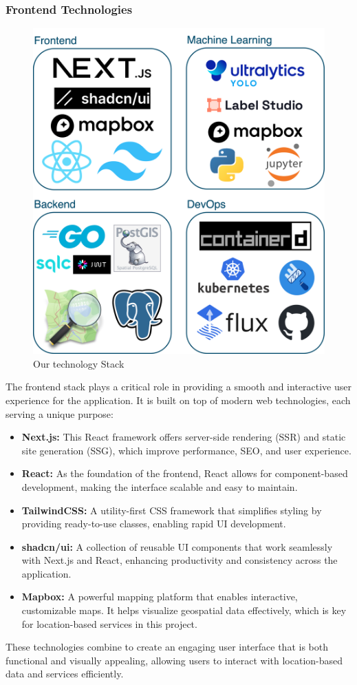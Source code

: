\subsubsection{Frontend Technologies}

\begin{figure}[ht]
    \centering{}
    \includegraphics[width=\textwidth]{images/stack_grid.png}
    \caption{Our technology Stack}
\end{figure}

The frontend stack plays a critical role in providing a smooth and interactive user experience for the application. It is built on top of modern web technologies, each serving a unique purpose:

\begin{itemize}
    \item{} \textbf{Next.js:} This React framework offers server{-}side rendering (SSR) and static site generation (SSG), which improve performance, SEO, and user experience.
    \item{} \textbf{React:} As the foundation of the frontend, React allows for component{-}based development, making the interface scalable and easy to maintain.
    \item{} \textbf{TailwindCSS:} A utility{-}first CSS framework that simplifies styling by providing ready{-}to{-}use classes, enabling rapid UI development.
    \item{} \textbf{shadcn/ui:} A collection of reusable UI components that work seamlessly with Next.js and React, enhancing productivity and consistency across the application.
    \item{} \textbf{Mapbox:} A powerful mapping platform that enables interactive, customizable maps. It helps visualize geospatial data effectively, which is key for location{-}based services in this project.
\end{itemize}

These technologies combine to create an engaging user interface that is both functional and visually appealing, allowing users to interact with location{-}based data and services efficiently.
